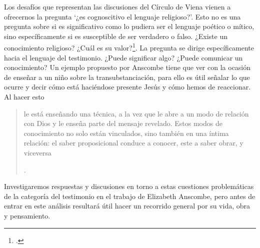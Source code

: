 Los desafíos que representan las discusiones del Círculo de Viena vienen a ofrecernos la pregunta \enquote*{¿es cognoscitivo el lenguaje religioso?}. Esto no es una pregunta sobre si es significativo como lo pudiera ser el lenguaje poético o mítico, sino específicamente si es susceptible de ser verdadero o falso. ¿Existe un conocimiento religioso? ¿Cuál es su valor?\footcite[Cf.][23]{conesa1994cc}. La pregunta se dirige específicamente hacia el lenguaje del testimonio. ¿Puede significar algo? ¿Puede comunicar un conocimiento? Un ejemplo propuesto por Anscombe tiene que ver con la ocasión de enseñar a un niño sobre la transubstanciación, para ello es útil señalar lo que ocurre y decir cómo está haciéndose presente Jesús y cómo hemos de reaccionar. Al hacer esto \blockquote[{\Cite[21]{conesa1994cc}}.]{le está enseñando una técnica, a la vez que le abre a un modo de relación con Dios y le enseña parte del mensaje revelado. Estos modos de conocimiento no solo están vinculados, sino también en una íntima relación: el saber proposicional conduce a conocer, este a saber obrar, y viceversa}.

Investigaremos respuestas y discusiones en torno a estas cuestiones problemáticas de la categoría del testimonio en el trabajo de Elizabeth Anscombe, pero antes de entrar en este análisis resultará útil hacer un recorrido general por su vida, obra y pensamiento.
